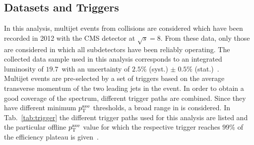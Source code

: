 \subsection{Datasets and Triggers}
\label{subsec:jer_samples_and_trigger}
\begin{table}[!tp]
\centering
\caption{Trigger paths with \ptave thresholds at which the trigger efficiency reaches the $99\%$ efficiency plateau. Thresholds are given for PFCHS jets.}
\label{tab:trigger}
\end{table}  
In this analysis, multijet events from \pp collisions are considered which have been recorded in 2012 with the CMS detector at $\sqrt{s}=8$\tev. From these data, only those are considered in which all subdetectors have been reliably operating. The collected data sample used in this analysis corresponds to an integrated luminosity of $19.7$~\fbinv with an uncertainty of $2.5\%$ (syst.)  $\pm \; 0.5\%$ (stat.)~\cite{CMS-PAS-LUM-13-001}. \\
Multijet events are pre-selected by a set of triggers based on the average transverse momentum of the two leading jets in the event. In order to obtain a good coverage of the \ptave spectrum, different trigger paths are combined. Since they have different minimum $p_{\text{T}}^\mathrm{ave}$ thresholds, a broad range in \ptave is considered. In Tab.~\ref{tab:trigger} the different trigger paths used for this analysis are listed and the particular offline $p_{\text{T}}^\mathrm{ave}$ value for which the respective trigger reaches $99\%$ of the efficiency plateau is given~\cite{DRathjens}.%
